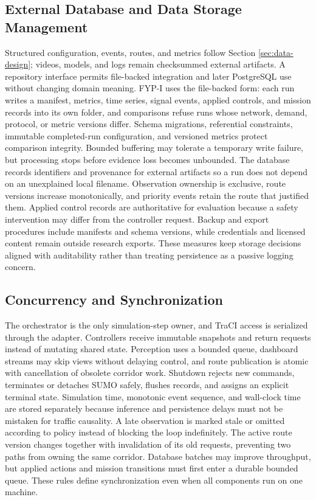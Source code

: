 \subsection{External Database and Data Storage Management}

Structured configuration, events, routes, and metrics follow Section \ref{sec:data-design}; videos, models, and logs remain checksummed external artifacts. A repository interface permits file-backed integration and later PostgreSQL use without changing domain meaning. FYP-I uses the file-backed form: each run writes a manifest, metrics, time series, signal events, applied controls, and mission records into its own folder, and comparisons refuse runs whose network, demand, protocol, or metric versions differ. Schema migrations, referential constraints, immutable completed-run configuration, and versioned metrics protect comparison integrity. Bounded buffering may tolerate a temporary write failure, but processing stops before evidence loss becomes unbounded. The database records identifiers and provenance for external artifacts so a run does not depend on an unexplained local filename. Observation ownership is exclusive, route versions increase monotonically, and priority events retain the route that justified them. Applied control records are authoritative for evaluation because a safety intervention may differ from the controller request. Backup and export procedures include manifests and schema versions, while credentials and licensed content remain outside research exports. These measures keep storage decisions aligned with auditability rather than treating persistence as a passive logging concern.

\subsection{Concurrency and Synchronization}

The orchestrator is the only simulation-step owner, and TraCI access is serialized through the adapter. Controllers receive immutable snapshots and return requests instead of mutating shared state. Perception uses a bounded queue, dashboard streams may skip views without delaying control, and route publication is atomic with cancellation of obsolete corridor work. Shutdown rejects new commands, terminates or detaches SUMO safely, flushes records, and assigns an explicit terminal state. Simulation time, monotonic event sequence, and wall-clock time are stored separately because inference and persistence delays must not be mistaken for traffic causality. A late observation is marked stale or omitted according to policy instead of blocking the loop indefinitely. The active route version changes together with invalidation of its old requests, preventing two paths from owning the same corridor. Database batches may improve throughput, but applied actions and mission transitions must first enter a durable bounded queue. These rules define synchronization even when all components run on one machine.

